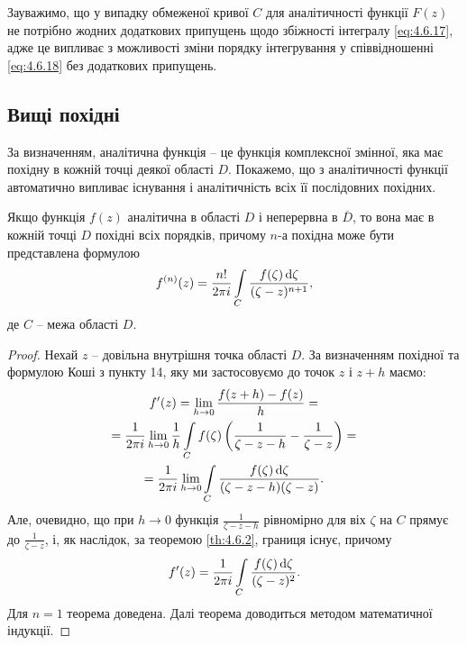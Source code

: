 Зауважимо, що у випадку обмеженої кривої $C$ для аналітичності функції $F(z)$ не потрібно жодних додаткових припущень щодо збіжності інтегралу \eqref{eq:4.6.17}, адже це випливає з можливості зміни порядку інтегрування у співвідношенні \eqref{eq:4.6.18} без додаткових припущень.


\subsection{Вищі похідні}
За визначенням, аналітична функція -- це функція комплексної змінної, яка має похідну в кожній точці деякої області $D$. Покажемо, що з аналітичності функції автоматично випливає існування і аналітичність всіх її послідовних похідних.

\begin{theorem}[О. Коші, 1842 р.]
	\label{th:4.7.1}
	Якщо функція $f(z)$ аналітична в області $D$ і неперервна в $\overline{D}$, то вона має в кожній точці $D$ похідні всіх порядків, причому $n$-а похідна може бути представлена формулою
	\begin{equation}
		\label{eq:4.7.1}
		f^{(n)}(z) = \dfrac{n!}{2 \pi i} \displaystyle\int\limits_C \dfrac{f(\zeta) \mathop{}\!\mathrm{d} \zeta}{(\zeta - z)^{n + 1}},
	\end{equation}
	де $C$ -- межа області $D$.
\end{theorem}


\begin{proof}
Нехай $z$ -- довільна внутрішня точка області $D$. За визначенням похідної та формулою Коші з пункту 14, яку ми застосовуємо до точок $z$ і $z + h$ маємо:
\begin{multline}
	\label{eq:4.7.2}
	f'(z) = \displaystyle\lim\limits_{h \to 0} \dfrac{f(z + h) - f(z)}{h} = \\ = \dfrac{1}{2 \pi i} \displaystyle\lim\limits_{h \to 0} \dfrac{1}{h} \displaystyle\int\limits_C f(\zeta) \left( \dfrac{1}{\zeta - z - h} - \dfrac{1}{\zeta - z} \right) = \\ = \dfrac{1}{2 \pi i} \displaystyle\lim\limits_{h \to 0} \displaystyle\int\limits_C \dfrac{f(\zeta) \mathop{}\!\mathrm{d} \zeta}{(\zeta - z - h) (\zeta - z)}.
\end{multline}
Але, очевидно, що при $h \to 0$ функція $\frac{1}{\zeta - z - h}$ рівномірно для віх $\zeta$ на $C$ прямує до $\frac{1}{\zeta - z}$, і, як наслідок, за теоремою \ref{th:4.6.2}, границя існує, причому
\begin{equation}
	\label{eq:4.7.3}
	f'(z) = \dfrac{1}{2 \pi i} \displaystyle\int\limits_C \dfrac{f(\zeta) \mathop{}\!\mathrm{d} \zeta}{(\zeta - z)^2}.
\end{equation}
Для $n = 1$ теорема доведена. Далі теорема доводиться методом математичної індукції.
\end{proof}

